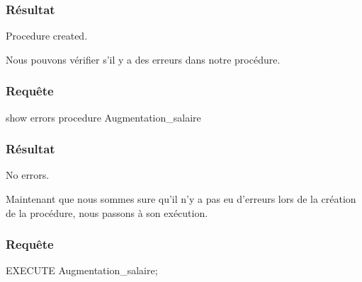 \documentclass[•]{article}
\begin{document}
\subsubsection{Résultat}
\begin{sql}
Procedure created.
\end{sql}

Nous pouvons vérifier s'il y a des erreurs dans notre procédure.
\subsubsection{Requête}
\begin{sql}
show errors procedure Augmentation_salaire
\end{sql}
\subsubsection{Résultat}
\begin{sql}
No errors.
\end{sql}

Maintenant que nous sommes sure qu'il n'y a pas eu d'erreurs lors de la création de la procédure, nous passons à son exécution.
\subsubsection{Requête}
\begin{sql}
EXECUTE Augmentation_salaire;
\end{sql}
\end{document}
